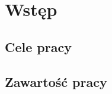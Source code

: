 \chapter{Wstęp}
\label{cha:wprowadzenie}

\section{Cele pracy}
\label{sec:celePracy}

\section{Zawartość pracy}
\label{sec: zawartosc_pracy}


















